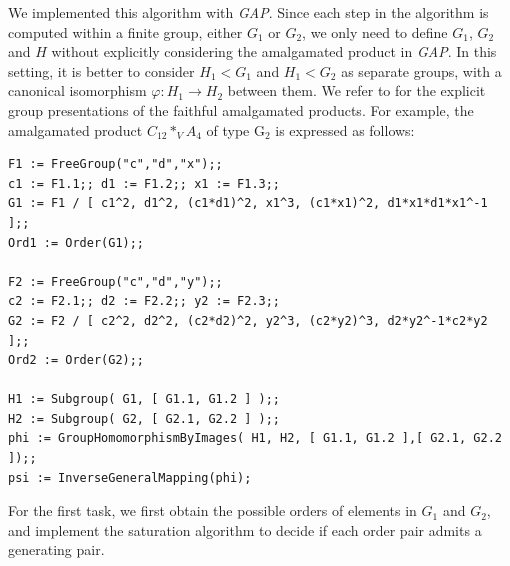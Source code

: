 \documentclass[12pt,leqno]{amsart}
\newcommand{\2}{L^2_{\rm per}(0, T)}
\numberwithin{equation}{section}
\numberwithin{figure}{section}
\begin{document}
We implemented this algorithm with \textit{GAP}. Since each step in the algorithm is computed within a finite group, either $G_1$ or $G_2$, we only need to define $G_1$, $G_2$ and $H$ without explicitly considering the amalgamated product in \textit{GAP}. In this setting, it is better to consider $H_1<G_1$ and $H_1<G_2$ as separate groups, with a canonical isomorphism $\varphi: H_1\to H_2$ between them. We refer to \cite{conder2025edge} for the explicit group presentations of the faithful amalgamated products. For example, the amalgamated product $C_{12} *_{V} A_4$ of type $\mathrm{G}_2$ is expressed as follows:
\begin{verbatim}
F1 := FreeGroup("c","d","x");;
c1 := F1.1;; d1 := F1.2;; x1 := F1.3;;
G1 := F1 / [ c1^2, d1^2, (c1*d1)^2, x1^3, (c1*x1)^2, d1*x1*d1*x1^-1 ];;
Ord1 := Order(G1);;

F2 := FreeGroup("c","d","y");;
c2 := F2.1;; d2 := F2.2;; y2 := F2.3;;
G2 := F2 / [ c2^2, d2^2, (c2*d2)^2, y2^3, (c2*y2)^3, d2*y2^-1*c2*y2 ];;
Ord2 := Order(G2);;

H1 := Subgroup( G1, [ G1.1, G1.2 ] );;
H2 := Subgroup( G2, [ G2.1, G2.2 ] );;
phi := GroupHomomorphismByImages( H1, H2, [ G1.1, G1.2 ],[ G2.1, G2.2 ]);;
psi := InverseGeneralMapping(phi);
\end{verbatim}
For the first task, we first obtain the possible orders of elements in $G_1$ and $G_2$, and implement the saturation algorithm to decide if each order pair admits a generating pair.
\end{document}
